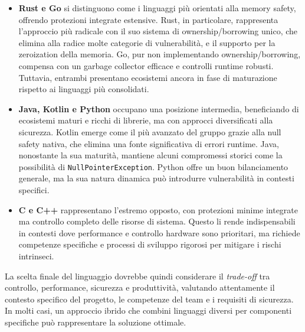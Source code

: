 \begin{itemize}
  \item \textbf{Rust e Go} si distinguono come i linguaggi più orientati alla
    memory safety, offrendo protezioni integrate estensive. Rust, in particolare,
    rappresenta l'approccio più radicale con il suo sistema di ownership/borrowing
    unico, che elimina alla radice molte categorie di vulnerabilità, e il
    supporto per la zeroization della memoria. Go, pur non implementando
    ownership/borrowing, compensa con un garbage collector efficace e controlli runtime
    robusti. Tuttavia, entrambi presentano ecosistemi ancora in fase di maturazione
    rispetto ai linguaggi più consolidati.

  \item \textbf{Java, Kotlin e Python} occupano una posizione intermedia, beneficiando
    di ecosistemi maturi e ricchi di librerie, ma con approcci diversificati
    alla sicurezza. Kotlin emerge come il più avanzato del gruppo grazie alla null
    safety nativa, che elimina una fonte significativa di errori runtime. Java,
    nonostante la sua maturità, mantiene alcuni compromessi storici come la possibilità
    di \texttt{NullPointerException}. Python offre un buon bilanciamento generale,
    ma la sua natura dinamica può introdurre vulnerabilità in contesti specifici.

  \item \textbf{C e C++} rappresentano l'estremo opposto, con protezioni minime integrate
    ma controllo completo delle risorse di sistema. Questo li rende
    indispensabili in contesti dove performance e controllo hardware sono
    prioritari, ma richiede competenze specifiche e processi di sviluppo rigorosi
    per mitigare i rischi intrinseci.
\end{itemize}

La scelta finale del linguaggio dovrebbe quindi considerare il \textit{trade-off}
tra controllo, performance, sicurezza e produttività, valutando attentamente il
contesto specifico del progetto, le competenze del team e i requisiti di sicurezza.
In molti casi, un approccio ibrido che combini linguaggi diversi per componenti specifiche
può rappresentare la soluzione ottimale.